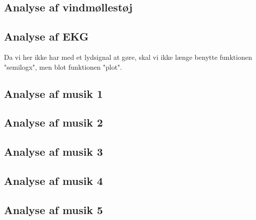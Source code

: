 \documentclass[12pt, letterpaper]{article}
\begin{document}
\subsection{Analyse af vindmøllestøj}

\subsection{Analyse af EKG}
Da vi her ikke har med et lydsignal at gøre, skal vi ikke længe benytte funktionen "semilogx", men blot funktionen "plot".

\subsection{Analyse af musik 1}

\subsection{Analyse af musik 2}

\subsection{Analyse af musik 3}

\subsection{Analyse af musik 4}

\subsection{Analyse af musik 5}
\end{document}
